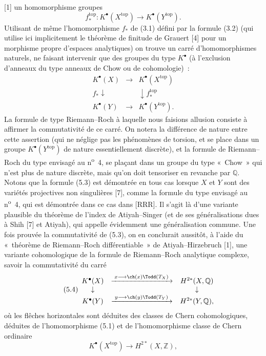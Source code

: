 [1] un
homomorphisme groupes
\begin{equation}\tag{5.2}
f^{\mathrm{top}}_*:K^\bullet(X^{\mathrm{top}})\longrightarrow K^\bullet(Y^{\mathrm{top}}).
\end{equation}
Utilisant de m\^eme l'homomorphisme $f_*$ de (3.1) d\'efini par la formule (3.2) (qui utilise ici implicitement le th\'eor\`eme de finitude de Grauert [4] pour un morphisme propre d'espaces analytiques) on trouve un carr\'e d'homomorphismes naturels, ne faisant intervenir que des groupes du type $K^\bullet$ (\`a l'exclusion d'anneaux du type anneaux de Chow ou de cohomologie)~:
\begin{equation}\tag{5.3}
\begin{array}{ccc}
K^\bullet(X) & \longrightarrow & K^\bullet(X^{\mathrm{top}}) \\
f_*\downarrow && \downarrow f^{\mathrm{top}}_* \\
K^\bullet(Y) & \longrightarrow & K^\bullet(Y^{\mathrm{top}}).
\end{array}
\end{equation}
La formule de type Riemann--Roch \`a laquelle nous faisions allusion consiste \`a affirmer la commutativit\'e de ce carr\'e. On notera la diff\'erence de nature entre cette assertion (qui ne n\'eglige pas les ph\'enom\`enes de torsion, et se place dans un groupe $K^\bullet(Y^{\mathrm{top}})$ de nature essentiellement discr\`ete), et la formule de Riemann--Roch du type envisag\'e au n\textsuperscript{o}~4, se pla\c{c}ant dans un groupe du type «~Chow~» qui n'est plus de nature discr\`ete, mais qu'on doit tensoriser en revanche par $\mathbb Q$. Notons que la formule (5.3) est d\'emontr\'ee en tous cas lorsque $X$ et $Y$ sont des vari\'et\'es projectives non singuli\`eres [7], comme la formule du type envisag\'e au n\textsuperscript{o}~4, qui est d\'emontr\'ee dans ce cas dans [RRR]. Il s'agit l\`a d'une variante plausible du th\'eor\`eme de l'index de Atiyah--Singer (et de ses g\'en\'eralisations dues \`a Shih [7] et Atiyah), qui appelle \'evidemment une g\'en\'eralisation commune. Une fois prouv\'ee la commutativit\'e de (5.3), on en conclurait aussit\^ot, \`a l'aide du «~th\'eor\`eme de Riemann--Roch diff\'erentiable~» de Atiyah--Hirzebruch [1], une variante cohomologique de la formule de Riemann--Roch analytique complexe, savoir la commutativit\'e du carr\'e
\begin{equation}\tag{5.4}
\begin{array}{ccc}
K^\bullet(X) & \xrightarrow{\;x\longrightarrow \ch(x)\Todd(T_X)\;} & H^{2*}(X,\mathbb Q) \\
\downarrow && \downarrow \\
K^\bullet(Y) & \xrightarrow{\;y\longrightarrow \ch(y)\Todd(T_Y)\;} & H^{2*}(Y,\mathbb Q),
\end{array}
\end{equation}
o\`u les fl\^eches horizontales sont d\'eduites des classes de Chern cohomologiques, d\'eduites de l'homomorphisme (5.1) et de l'homomorphisme classe de Chern ordinaire
\[
K^\bullet(X^{\mathrm{top}})\longrightarrow H^{2*}(X,\mathbb Z),
\]
